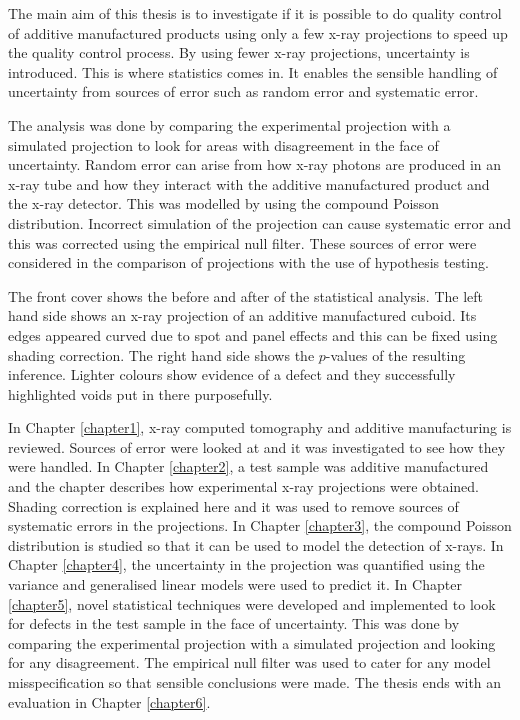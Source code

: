 \documentclass[12pt, a4paper, oneside]{memoir}
\begin{document}
The main aim of this thesis is to investigate if it is possible to do quality control of additive manufactured products using only a few x-ray projections to speed up the quality control process. By using fewer x-ray projections, uncertainty is introduced. This is where statistics comes in. It enables the sensible handling of uncertainty from sources of error such as random error and systematic error.

The analysis was done by comparing the experimental projection with a simulated projection to look for areas with disagreement in the face of uncertainty. Random error can arise from how x-ray photons are produced in an x-ray tube and how they interact with the additive manufactured product and the x-ray detector. This was modelled by using the compound Poisson distribution. Incorrect simulation of the projection can cause systematic error and this was corrected using the empirical null filter. These sources of error were considered in the comparison of projections with the use of hypothesis testing.

The front cover shows the before and after of the statistical analysis. The left hand side shows an x-ray projection of an additive manufactured cuboid. Its edges appeared curved due to spot and panel effects and this can be fixed using shading correction. The right hand side shows the $p$-values of the resulting inference. Lighter colours show evidence of a defect and they successfully highlighted voids put in there purposefully.

In Chapter \ref{chapter1}, x-ray computed tomography and additive manufacturing is reviewed. Sources of error were looked at and it was investigated to see how they were handled. In Chapter \ref{chapter2}, a test sample was additive manufactured and the chapter describes how experimental x-ray projections were obtained. Shading correction is explained here and it was used to remove sources of systematic errors in the projections. In Chapter \ref{chapter3}, the compound Poisson distribution is studied so that it can be used to model the detection of x-rays. In Chapter \ref{chapter4}, the uncertainty in the projection was quantified using the variance and generalised linear models were used to predict it. In Chapter \ref{chapter5}, novel statistical techniques were developed and implemented to look for defects in the test sample in the face of uncertainty. This was done by comparing the experimental projection with a simulated projection and looking for any disagreement. The empirical null filter was used to cater for any model misspecification so that sensible conclusions were made. The thesis ends with an evaluation in Chapter \ref{chapter6}.
\end{document}
